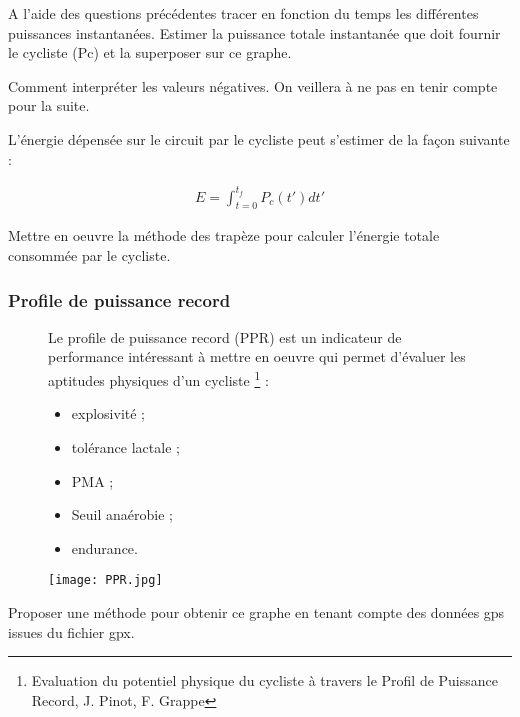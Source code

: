\question{} A l'aide des questions précédentes tracer en fonction du temps les différentes puissances instantanées. Estimer la puissance totale instantanée que doit fournir le cycliste (Pc) et la superposer sur ce graphe.

\question{} Comment interpréter les valeurs négatives. On veillera à ne pas en tenir compte pour la suite.

L'énergie dépensée sur le circuit par le cycliste peut s'estimer de la façon suivante : 

\begin{align*}
E=\displaystyle{\int_{t=0}^{t_f}P_c(t')dt'}
\end{align*}

\question{} Mettre en oeuvre la méthode des trapèze pour calculer l'énergie totale consommée par le cycliste.


\subsubsection*{Profile de puissance record}



\begin{figure}[!htb]
\begin{minipage}{0.5\textwidth}
Le profile de puissance record (PPR) est un indicateur de performance intéressant à mettre en oeuvre qui permet d'évaluer les aptitudes physiques d'un cycliste \footnote{Evaluation du potentiel physique du cycliste à travers le Profil de Puissance Record, J. Pinot, F. Grappe}  : 
\begin{itemize}
\item explosivité ;
\item tolérance lactale ;
\item PMA ;
\item Seuil anaérobie ;
\item endurance.
\end{itemize}
\end{minipage}
\begin{minipage}{0.5\textwidth}
\begin{center}
\texttt{[image: PPR.jpg]}
\caption{\label{PPR}}
\end{center}
\end{minipage}
\end{figure}

\question{} Proposer une méthode pour obtenir ce graphe en tenant compte des données gps issues du fichier gpx.

